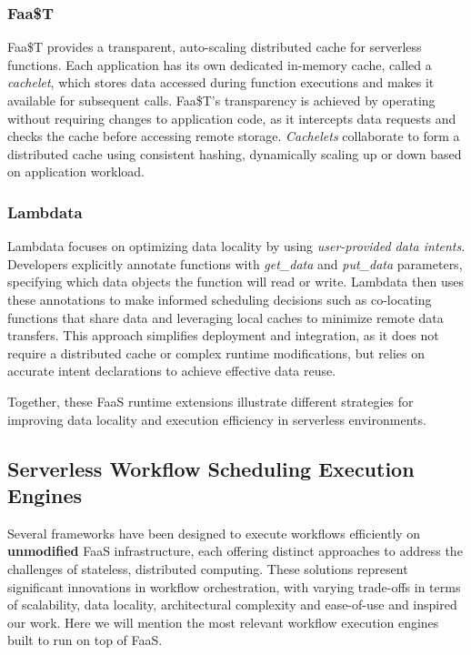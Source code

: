 \documentclass[conference]{IEEEtran}
\begin{document}
\subsubsection{Faa\$T}
Faa\$T provides a transparent, auto-scaling distributed cache for serverless functions. Each application has its own dedicated in-memory cache, called a \textit{cachelet}, which stores data accessed during function executions and makes it available for subsequent calls. Faa\$T's transparency is achieved by operating without requiring changes to application code, as it intercepts data requests and checks the cache before accessing remote storage. \textit{Cachelets} collaborate to form a distributed cache using consistent hashing, dynamically scaling up or down based on application workload.

\subsubsection{Lambdata}
Lambdata focuses on optimizing data locality by using \textit{user-provided data intents}. Developers explicitly annotate functions with \textit{get\_data} and \textit{put\_data} parameters, specifying which data objects the function will read or write. Lambdata then uses these annotations to make informed scheduling decisions such as co-locating functions that share data and leveraging local caches to minimize remote data transfers. This approach simplifies deployment and integration, as it does not require a distributed cache or complex runtime modifications, but relies on accurate intent declarations to achieve effective data reuse.

Together, these FaaS runtime extensions illustrate different strategies for improving data locality and execution efficiency in serverless environments.

\subsection{Serverless Workflow Scheduling Execution Engines}

Several frameworks have been designed to execute workflows efficiently on \textbf{unmodified} FaaS infrastructure, each offering distinct approaches to address the challenges of stateless, distributed computing. These solutions represent significant innovations in workflow orchestration, with varying trade-offs in terms of scalability, data locality, architectural complexity and ease-of-use and inspired our work. Here we will mention the most relevant workflow execution engines built to run on top of FaaS.
\end{document}
